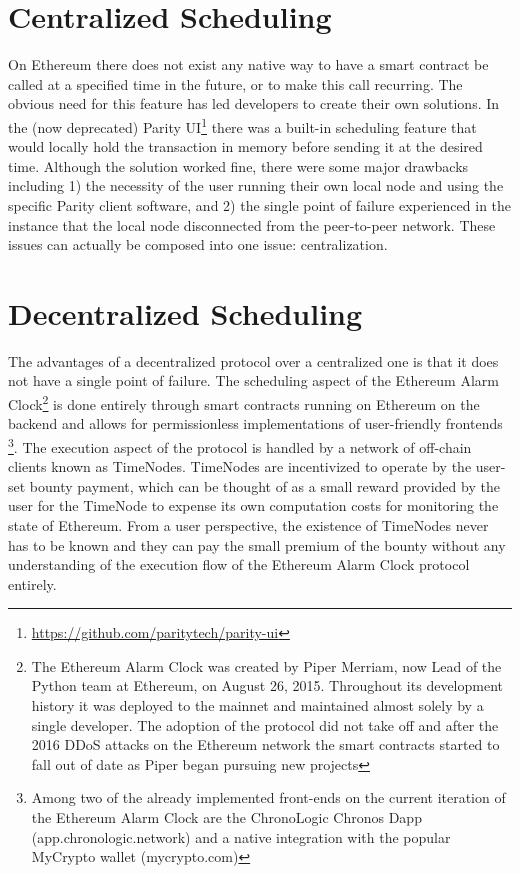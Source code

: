 \documentclass{report}
\begin{document}
  \section{Centralized Scheduling}
  On Ethereum there does not exist any native way to have a smart contract be called at a specified time in the future, or to make this call recurring. The obvious need for this feature has led developers to create their own solutions. In the (now deprecated) Parity UI\footnote{\url{https://github.com/paritytech/parity-ui}} there was a built-in scheduling feature that would locally hold the transaction in memory before sending it at the desired time. Although the solution worked fine, there were some major drawbacks including 1) the necessity of the user running their own local node and using the specific Parity client software, and 2) the single point of failure experienced in the instance that the local node disconnected from the peer-to-peer network. These issues can actually be composed into one issue: centralization.
  \section{Decentralized Scheduling}
  The advantages of a decentralized protocol over a centralized one is that it does not have a single point of failure. The scheduling aspect of the Ethereum Alarm Clock\footnote{The Ethereum Alarm Clock was created by Piper Merriam, now Lead of the Python team at Ethereum, on August 26, 2015. Throughout its development history it was deployed to the mainnet and maintained almost solely by a single developer. The adoption of the protocol did not take off and after the 2016 DDoS attacks on the Ethereum network the smart contracts started to fall out of date as Piper began pursuing new projects} is done entirely through smart contracts running on Ethereum on the backend and allows for permissionless implementations of user-friendly frontends \footnote{Among two of the already implemented front-ends on the current iteration of the Ethereum Alarm Clock are the ChronoLogic Chronos Dapp (app.chronologic.network) and a native integration with the popular MyCrypto wallet (mycrypto.com)}. The execution aspect of the protocol is handled by a network of off-chain clients known as TimeNodes. TimeNodes are incentivized to operate by the user-set bounty payment, which can be thought of as a small reward provided by the user for the TimeNode to expense its own computation costs for monitoring the state of Ethereum. From a user perspective, the existence of TimeNodes never has to be known and they can pay the small premium of the bounty without any understanding of the execution flow of the Ethereum Alarm Clock protocol entirely.
\end{document}
